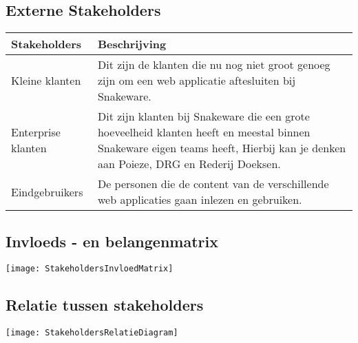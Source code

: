 \subsection{Externe Stakeholders}
\begin{tabular}{ | p{4cm} | p{9cm} | }
	\hline
	\textbf{Stakeholders} & \textbf{Beschrijving}                                                                                                                                                           \\
    \hline
	Kleine klanten        & Dit zijn de klanten die nu nog niet groot genoeg zijn om een web applicatie aftesluiten bij Snakeware.                                                                          \\
	\hline
	Enterprise klanten    & Dit zijn klanten bij Snakeware die een grote hoeveelheid klanten heeft en meestal binnen Snakeware eigen teams heeft, Hierbij kan je denken aan Poieze, DRG en Rederij Doeksen. \\
	\hline
	Eindgebruikers        & De personen die de content van de verschillende web applicaties gaan inlezen en gebruiken.                                                                                      \\
	\hline
\end{tabular}
\subsection{Invloeds - en belangenmatrix}
\texttt{[image: StakeholdersInvloedMatrix]}
\subsection{Relatie tussen stakeholders}
\texttt{[image: StakeholdersRelatieDiagram]}


